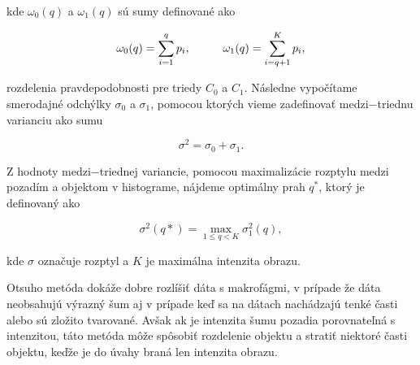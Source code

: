 \documentclass[a4paper,11pt,oneside]{article}%
\begin{document}
kde $\omega_0(q)$ a $\omega_1(q)$ sú sumy definované ako

\begin{equation}
\omega_0(q) = \sum_{i=1}^{q} p_i, \hspace{10mm} \omega_1(q) =  \sum_{i=q + 1}^{K} p_i,
\end{equation}

 rozdelenia pravdepodobnosti pre triedy $C_0$ a $C_1$. Následne vypočítame smerodajné odchýlky $\sigma_0$ a $\sigma_1$, pomocou ktorých vieme zadefinovať 
%
%
medzi$-$triednu varianciu ako sumu

\begin{equation}
\sigma^2 = \sigma_0 + \sigma_1.
\end{equation}

Z hodnoty medzi$-$triednej variancie, pomocou maximalizácie rozptylu medzi pozadím a objektom v histograme, nájdeme optimálny prah $q^*$, ktorý je definovaný ako

\begin{equation}
\sigma^2(q*) = \max_{1 \leq q < K} \sigma^2_1(q),
\end{equation}

kde $\sigma$ označuje rozptyl a $K$ je maximálna intenzita obrazu.

Otsuho metóda dokáže dobre rozlíšiť dáta s makrofágmi, v prípade že dáta neobsahujú výrazný šum aj v prípade keď sa na dátach nachádzajú tenké časti alebo sú zložito tvarované. Avšak ak je intenzita šumu pozadia porovnateľná s intenzitou, táto metóda môže spôsobiť rozdelenie objektu a stratiť niektoré časti objektu, keďže je do úvahy braná len intenzita obrazu.

\end{document}
